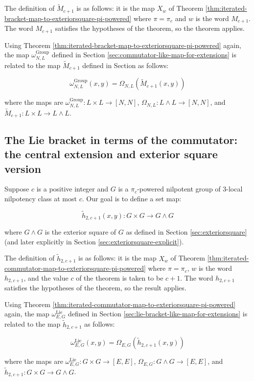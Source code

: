 \documentclass{ucetd}
\begin{document}
The definition of $\tilde{M}_{c+1}$ is as follows: it is the map $X_w$
of Theorem \ref{thm:iterated-bracket-map-to-exteriorsquare-pi-powered}
where $\pi = \pi_c$ and $w$ is the word $M_{c+1}$. The word $M_{c+1}$
satisfies the hypotheses of the theorem, so the theorem applies.

Using Theorem
\ref{thm:iterated-bracket-map-to-exteriorsquare-pi-powered} again, the
map $\omega_{N,L}^{\text{Group}}$ defined in Section
\ref{sec:commutator-like-map-for-extensions} is related to the map
$\tilde{M}_{c+1}$ defined in Section as follows:

$$\omega_{N,L}^{\text{Group}}(x,y) = \Omega_{N,L}(\tilde{M}_{c+1}(x,y))$$

where the maps are $\omega_{N,L}^{\text{Group}}: L \times L \to [N,N]$,
$\Omega_{N,L}: L \wedge L \to [N,N]$, and $\tilde{M}_{c+1}:L \times L
\to L \wedge L$.

\subsection{The Lie bracket in terms of the commutator: the central extension and exterior square version}\label{sec:lie-bracket-ito-group-commutator-exteriorsquare-version}

Suppose $c$ is a positive integer and $G$ is a $\pi_c$-powered nilpotent group
of $3$-local nilpotency class at most $c$. Our goal is to define a set
map:

$$\tilde{h}_{2,c+1}(x,y): G \times G \to G \wedge G$$

where $G \wedge G$ is the exterior square of $G$ as defined in Section
\ref{sec:exteriorsquare} (and later explicitly in Section
\ref{sec:exteriorsquare-explicit}). 

The definition of $\tilde{h}_{2,c+1}$ is as follows: it is the map
$X_w$ of Theorem
\ref{thm:iterated-commutator-map-to-exteriorsquare-pi-powered} where
$\pi = \pi_c$, $w$ is the word $h_{2,c+1}$, and the value $c$ of the
theorem is taken to be $c + 1$. The word $h_{2,c+1}$ satisfies the
hypotheses of the theorem, so the result applies.

Using Theorem
\ref{thm:iterated-commutator-map-to-exteriorsquare-pi-powered} again,
the map $\omega_{E,G}^{\text{Lie}}$ defined in Section
\ref{sec:lie-bracket-like-map-for-extensions} is related to the map
$\tilde{h}_{2,c+1}$ as follows:

$$\omega_{E,G}^{\text{Lie}}(x,y) = \Omega_{E,G}(\tilde{h}_{2,c+1}(x,y))$$

where the maps are $\omega_{E,G}^{\text{Lie}}: G \times G \to [E,E]$,
$\Omega_{E,G}: G \wedge G \to [E,E]$, and $\tilde{h}_{2,c+1}:G \times G
\to G \wedge G$.
\end{document}
